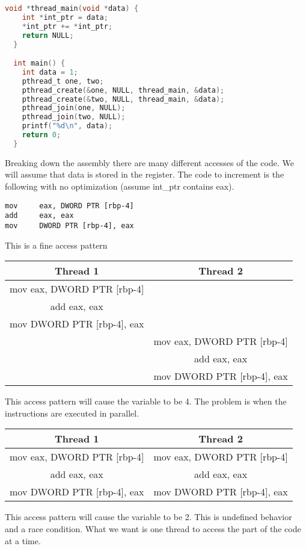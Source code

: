 \begin{lstlisting}[language=C]
  void *thread_main(void *data) {
    int *int_ptr = data;
    *int_ptr += *int_ptr;
    return NULL;
  }

  int main() {
    int data = 1;
    pthread_t one, two;
    pthread_create(&one, NULL, thread_main, &data);
    pthread_create(&two, NULL, thread_main, &data);
    pthread_join(one, NULL);
    pthread_join(two, NULL);
    printf("%d\n", data);
    return 0;
  }
\end{lstlisting}

Breaking down the assembly there are many different accesses of the code.
We will assume that data is stored in the  register.
The code to increment is the following with no optimization (assume int\_ptr contains eax).

\begin{lstlisting}
mov     eax, DWORD PTR [rbp-4]
add     eax, eax
mov     DWORD PTR [rbp-4], eax
\end{lstlisting}

This is a fine access pattern

\begin{tabular}{| c | c |}
  Thread 1 & Thread 2 \\ \hline
mov     eax, DWORD PTR [rbp-4] & \\
add     eax, eax & \\
mov     DWORD PTR [rbp-4], eax & \\ \hline
& mov     eax, DWORD PTR [rbp-4] \\
& add     eax, eax \\
& mov     DWORD PTR [rbp-4], eax \\ \hline
\end{tabular}

This access pattern will cause the variable  to be 4.
The problem is when the instructions are executed in parallel.

\begin{tabular}{| c | c |}
  Thread 1 & Thread 2 \\ \hline
mov     eax, DWORD PTR [rbp-4] & mov     eax, DWORD PTR [rbp-4] \\
add     eax, eax & add     eax, eax \\
mov     DWORD PTR [rbp-4], eax & mov     DWORD PTR [rbp-4], eax \\
\end{tabular}

This access pattern will cause the variable  to be 2.
This is undefined behavior and a race condition.
What we want is one thread to access the part of the code at a time.

